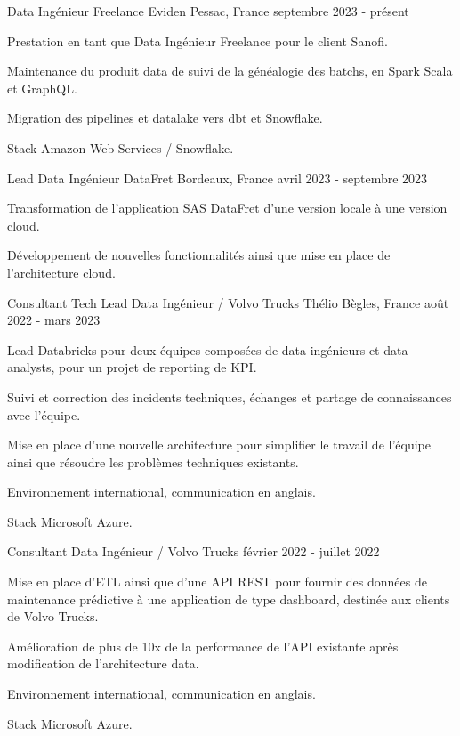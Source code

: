
\begin{cventries}
	\cventry
	{Data Ingénieur Freelance}
	{Eviden}
	{Pessac, France}
	{septembre 2023 - présent}
	{
		\begin{cvitems}
			\item {Prestation en tant que Data Ingénieur Freelance pour le client Sanofi.}
			\item {Maintenance du produit data de suivi de la généalogie des batchs, en Spark Scala et GraphQL.}
			\item {Migration des pipelines et datalake vers dbt et Snowflake.}
			\item {Stack Amazon Web Services / Snowflake.}
		\end{cvitems}
	}
	
	\cventry
	{Lead Data Ingénieur}
	{DataFret}
	{Bordeaux, France}
	{avril 2023 - septembre 2023}
	{
		\begin{cvitems}
			\item {Transformation de l'application SAS DataFret d'une version locale à une version cloud.}
			\item {Développement de nouvelles fonctionnalités ainsi que mise en place de l'architecture cloud.}
		\end{cvitems}
	}
	
	\cventry
	{Consultant Tech Lead Data Ingénieur / Volvo Trucks}
	{Thélio}
	{Bègles, France}
	{août 2022 - mars 2023}
	{
		\begin{cvitems}
			\item Lead Databricks pour deux équipes composées de data ingénieurs et data analysts, pour un projet de reporting de KPI.
			\item Suivi et correction des incidents techniques, échanges et partage de connaissances avec l'équipe.
			\item Mise en place d'une nouvelle architecture pour simplifier le travail de l'équipe ainsi que résoudre les problèmes techniques existants.
			\item Environnement international, communication en anglais.
			\item Stack Microsoft Azure.
		\end{cvitems}
	}
	
	\cventry
	{Consultant Data Ingénieur / Volvo Trucks}{}{}
	{février 2022 - juillet 2022}
	{
		\begin{cvitems}
			\item Mise en place d'ETL ainsi que d'une API REST pour fournir des données de maintenance prédictive à une application de type dashboard, destinée aux clients de Volvo Trucks.
			\item Amélioration de plus de 10x de la performance de l'API existante après modification de l'architecture data.
			\item Environnement international, communication en anglais.
			\item Stack Microsoft Azure.
		\end{cvitems}
	}
	

\end{cventries}
